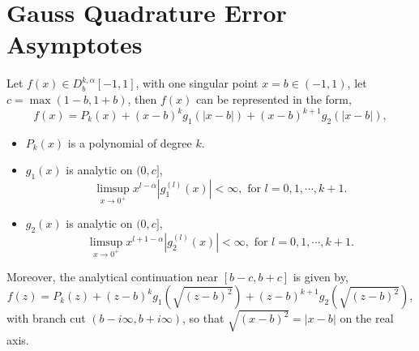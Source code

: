 \documentclass[10pt,a4paper]{amsart}
\begin{document}
\section{Gauss Quadrature Error Asymptotes} \label{sec:proof}\begin{lemma} \label{f_decomposition}
    Let $f(x) \in D_b^{k,\alpha}[-1,1]$, with one singular point $x=b \in (-1,1)$, let $c = \max(1-b,1+b)$, then $f(x)$ can be represented in the form,
    \begin{equation}
        f(x) = P_{k}(x) + (x-b)^k g_1(|x-b|) + (x-b)^{k+1} g_2(|x-b|),
    \end{equation}
    \begin{itemize}
        \item $P_k(x)$ is a polynomial of degree $k$.
        \item $g_1(x)$ is analytic on $(0,c]$, \begin{equation}
            \limsup_{x\to 0^+} x^{l-\alpha} |g_1^{(l)}(x)| < \infty, \text{ for } l=0,1,\cdots,k+1. \label{g_1_condition}
        \end{equation}
        \item $g_2(x)$ is analytic on $(0,c]$, \begin{equation}
            \limsup_{x\to 0^+} x^{l+1-\alpha} |g_2^{(l)}(x)| < \infty, \text{ for } l=0,1,\cdots,k+1. \label{g_2_condition}
        \end{equation}
    \end{itemize}
    Moreover, the analytical continuation near $[b-c,b+c]$ is given by,
    \begin{equation}
        f(z) = P_{k}(z) + (z-b)^k g_1(\sqrt{(z-b)^2}) + (z-b)^{k+1} g_2(\sqrt{(z-b)^2}), \label{f_analytical_continuation}
    \end{equation}
    with branch cut $(b-i\infty,b+i\infty)$, so that $\sqrt{(x-b)^2}=|x-b|$ on the real axis.
\end{lemma}
\end{document}
